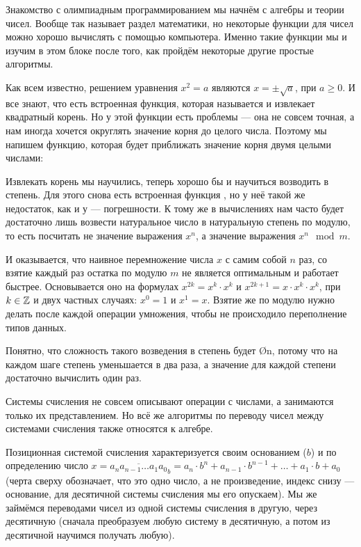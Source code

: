 Знакомство с олимпиадным программированием мы начнём с алгебры и теории чисел. Вообще так называет раздел математики, но некоторые функции для чисел можно хорошо вычислять с помощью компьютера. Именно такие функции мы и изучим в этом блоке после того, как пройдём некоторые другие простые алгоритмы.


Как всем известно, решением уравнения $x^2 = a$ являются $x = \pm \sqrt{a}$, при $a \geq 0$. И все знают, что есть встроенная функция, которая называется  и извлекает квадратный корень. Но у этой функции есть проблемы — она не совсем точная, а нам иногда хочется округлять значение корня до целого числа. Поэтому мы напишем функцию, которая будет приближать значение корня двумя целыми числами:


Извлекать корень мы научились, теперь хорошо бы и научиться возводить в степень. Для этого снова есть встроенная функция , но у неё такой же недостаток, как и у  — погрешности. К тому же в вычислениях нам часто будет достаточно лишь возвести натуральное число в натуральную степень по модулю, то есть посчитать не значение выражения $x^n$, а значение выражения $x^n \mod m$.

И оказывается, что наивное перемножение числа $x$ с самим собой $n$ раз, со взятие каждый раз остатка по модулю $m$ не является оптимальным и  работает быстрее. Основывается оно на формулах $x^{2k} = x^k \cdot x^k$ и $x^{2k + 1} = x \cdot x^k \cdot x^k$, при $k \in \mathbb{Z}$ и двух частных случаях: $x^0 = 1$ и $x^1 = x$. Взятие же по модулю нужно делать после каждой операции умножения, чтобы не происходило переполнение типов данных.

Понятно, что сложность такого возведения в степень будет \O{\log n}, потому что на каждом шаге степень уменьшается в два раза, а значение для каждой степени достаточно вычислить один раз.


Системы счисления не совсем описывают операции с числами, а занимаются только их представлением. Но всё же алгоритмы по переводу чисел между системами счисления также относятся к алгебре.

Позиционная системой счисления характеризуется своим основанием ($b$) и по определению число $x = \overline{a_n a_{n - 1} \ldots a_1 a_0}_b = a_n \cdot b^n + a_{n - 1} \cdot b^{n - 1} + \ldots + a_1 \cdot b + a_0$ (черта сверху обозначает, что это одно число, а не произведение, индекс снизу — основание, для десятичной системы счисления мы его опускаем). Мы же займёмся переводами чисел из одной системы счисления в другую, через десятичную (сначала преобразуем любую систему в десятичную, а потом из десятичной научимся получать любую).

